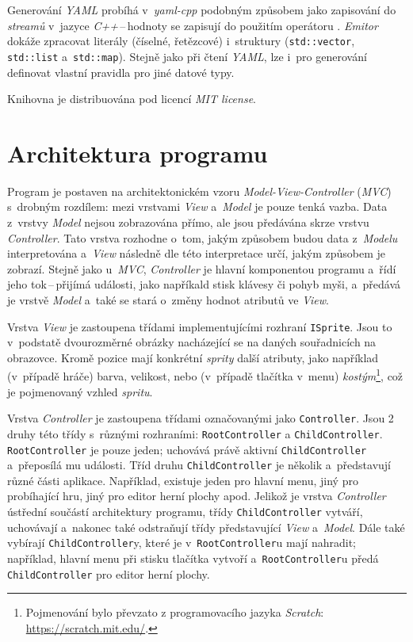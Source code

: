 Generování \emph{YAML} probíhá v~\emph{yaml-cpp} podobným způsobem jako zapisování do \emph{streamů} v~jazyce \emph{C++}\,--\,hodnoty se zapisují do  použitím operátoru \uv{\texttt{<{}<}}. \emph{Emitor} dokáže zpracovat literály (číselné, řetězcové) i~struktury (\texttt{std::vector}, \texttt{std::list} a~\texttt{std::map}). Stejně jako při čtení \emph{YAML}, lze i~pro generování definovat vlastní pravidla pro jiné datové typy.

Knihovna je distribuována pod licencí \emph{MIT license}.


\section{Architektura programu}

Program je postaven na architektonickém vzoru \emph{Model-View-Controller} (\emph{MVC}) s~drobným rozdílem: mezi vrstvami \emph{View} a~\emph{Model} je pouze tenká vazba. Data z~vrstvy \emph{Model} nejsou zobrazována přímo, ale jsou předávána skrze vrstvu \emph{Controller}. Tato vrstva rozhodne o~tom, jakým způsobem budou data z~\emph{Modelu} interpretována a~\emph{View} následně dle této interpretace určí, jakým způsobem je zobrazí. Stejně jako u~\emph{MVC}, \emph{Controller} je hlavní komponentou programu a~řídí jeho tok\,--\,přijímá události, jako napříkald stisk klávesy či pohyb myši, a~předává je vrstvě \emph{Model} a~také se stará o~změny hodnot atributů ve \emph{View}.

Vrstva \emph{View} je zastoupena třídami implementujícími rozhraní \texttt{ISprite}. Jsou to v~podstatě dvourozměrné obrázky nacházející se na daných souřadnicích na obrazovce. Kromě pozice mají konkrétní \emph{sprity} další atributy, jako například (v~případě hráče) barva, velikost, nebo (v~případě tlačítka v~menu) \emph{kostým}\footnote{Pojmenování  bylo převzato z programovacího jazyka \emph{Scratch}: \url{https://scratch.mit.edu/}.}, což je pojmenovaný vzhled \emph{spritu}.

Vrstva \emph{Controller} je zastoupena třídami označovanými jako \texttt{Controller}. Jsou 2 druhy této třídy s~různými rozhraními: \texttt{RootController} a \texttt{ChildController}. \texttt{Root\-Con\-trol\-ler} je pouze jeden; uchovává právě aktivní \texttt{ChildController} a~přeposílá mu události. Tříd druhu \texttt{ChildController} je několik a~představují různé části aplikace. Například, existuje jeden pro hlavní menu, jiný pro probíhající hru, jiný pro editor herní plochy apod. Jelikož je vrstva \emph{Controller} ústřední součástí architektury programu, třídy \texttt{ChildController} vytváří, uchovávají a~nakonec také odstraňují třídy představující \emph{View} a~\emph{Model}. Dále také vybírají \texttt{ChildController}y, které je v~\texttt{RootController}u mají nahradit; například, hlavní menu při stisku tlačítka vytvoří a~\texttt{RootController}u předá \texttt{ChildController} pro editor herní plochy.

